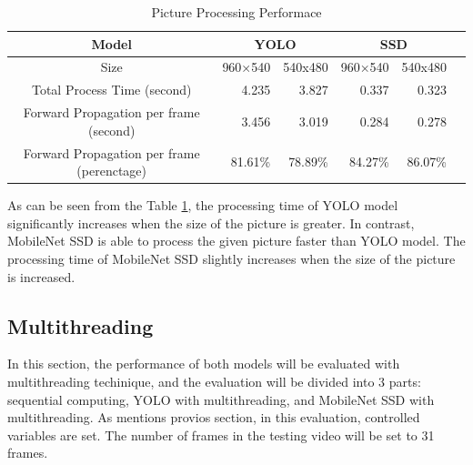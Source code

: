             \begin{table}[!htp]\centering
                \scriptsize
                \begin{tabular}{lrrrrrr}\toprule
                    \multicolumn{2}{c}{Model} &\multicolumn{2}{c}{YOLO} &\multicolumn{2}{c}{SSD} \\\midrule
                    \multicolumn{2}{c}{Size} &960×540 &540x480 &960×540 &540x480 \\
                    \multicolumn{2}{c}{Total Process Time (second)} &4.235 &3.827 &0.337 &0.323 \\
                    \multicolumn{2}{c}{Forward Propagation per frame (second)} &3.456 &3.019 &0.284 &0.278 \\
                    \multicolumn{2}{c}{Forward Propagation per frame (perenctage)} &81.61\% &78.89\% &84.27\% &86.07\% \\
                    \bottomrule
                \end{tabular}

                \caption{Picture Processing Performace}\label{performance:picture}
            \end{table}

            As can be seen from the Table \ref{performance:picture}, the processing time of YOLO model significantly increases when the size of the picture is greater.
            In contrast, MobileNet SSD is able to process the given picture faster than YOLO model.
            The processing time of MobileNet SSD slightly increases when the size of the picture is increased.

        \subsection{Multithreading}
            In this section, the performance of both models will be evaluated with multithreading techinique,
            and the evaluation will be divided into 3 parts: sequential computing, YOLO with multithreading, and MobileNet SSD with multithreading.
            As mentions provios section, in this evaluation, controlled variables are set.
            The number of frames in the testing video will be set to 31 frames.

